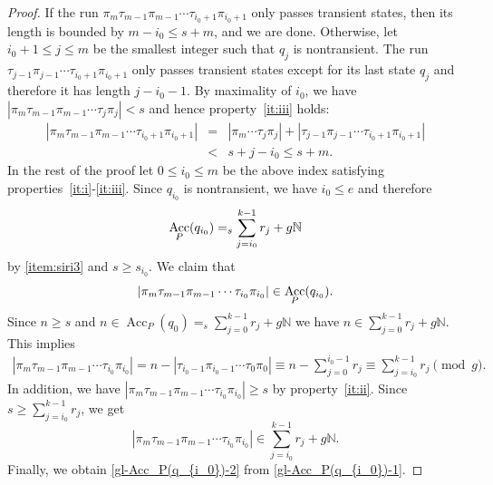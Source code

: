 \documentclass{theoretics}
\newcommand{\N}{\mathbb{N}}
\DeclareMathOperator{\Acc}{Acc}
\renewcommand{\geq}{\geqslant}
\renewcommand{\leq}{\leqslant}
\renewcommand{\ge}{\geq}
\renewcommand{\le}{\leq}
\begin{document}
\begin{proof}
If the run $\pi_m \tau_{m-1} \pi_{m-1} \cdots \tau_{{i_0}+1} \pi_{{i_0}+1}$ only passes transient states,
then its length is bounded by $m-{i_0} \le s + m$,  
and we are done.
Otherwise, let ${i_0}+1 \le j \le m$ be the smallest integer such that $q_j$ is nontransient.
The run $\tau_{j-1} \pi_{j-1} \cdots \tau_{{i_0}+1} \pi_{{i_0}+1}$ only passes transient states except for 
its last state $q_j$ 
and therefore it has length $j-{i_0}-1$.
By maximality of ${i_0}$, we have $|\pi_m  \tau_{m-1} \pi_{m-1} \cdots \tau_j \pi_j| < s$
and hence property~\ref{it:iii} holds:
\begin{eqnarray*}
	|\pi_m \tau_{m-1} \pi_{m-1} \cdots \tau_{{i_0}+1} \pi_{{i_0}+1}|  &=& |\pi_m \cdots \tau_j \pi_j| + |\tau_{j-1} \pi_{j-1} \cdots \tau_{{i_0}+1} \pi_{{i_0}+1}|  \\
	&< & s + j - {i_0} \le s + m.
\end{eqnarray*}
In the rest of the proof let $0 \le {i_0} \le m$ be the above index satisfying properties~\ref{it:i}-\ref{it:iii}.
Since $q_{i_0}$ is nontransient, we have $i_0 \le e$
and therefore 
\begin{equation} \label{gl-Acc_P(q_{i_0})-1}
\Acc_P(q_{i_0}) =_s \sum_{j={i_0}}^{k-1} r_j + g \N
\end{equation} 
by \ref{item:siri3} and $s \geq s_{i_0}$.
We claim that 
\begin{equation} \label{gl-Acc_P(q_{i_0})-2}
|\pi_m \tau_{m-1} \pi_{m-1} \cdots \tau_{i_0} \pi_{i_0}| \in \Acc_P(q_{i_0}).
\end{equation}
Since $n \ge s$ and $n \in \Acc_P(q_0) =_{s} \sum_{j=0}^{k-1} r_j + g \N$ 
we have $n \in \sum_{j=0}^{k-1} r_j + g \N$. This implies
\begin{align*}
	|\pi_m \tau_{m-1} \pi_{m-1} \cdots \tau_{i_0} \pi_{i_0}| = n - |\tau_{{i_0}-1} \pi_{{i_0}-1} \cdots \tau_0 \pi_0|  
	 \equiv n - \sum_{j=0}^{{i_0}-1} r_j 
	  \equiv \sum_{j={i_0}}^{k-1} r_j \pmod g.
\end{align*}
In addition, we have $|\pi_m \tau_{m-1} \pi_{m-1} \cdots \tau_{i_0} \pi_{i_0}| \geq s$ 
by property~\ref{it:ii}. Since $s \geq \sum_{j={i_0}}^{k-1} r_j$, we get
\[ 
|\pi_m \tau_{m-1} \pi_{m-1} \cdots \tau_{i_0} \pi_{i_0}|  \in \sum_{j={i_0}}^{k-1} r_j + g \N.
\]
Finally, we obtain \eqref{gl-Acc_P(q_{i_0})-2} from \eqref{gl-Acc_P(q_{i_0})-1}.


\end{proof}
\end{document}
